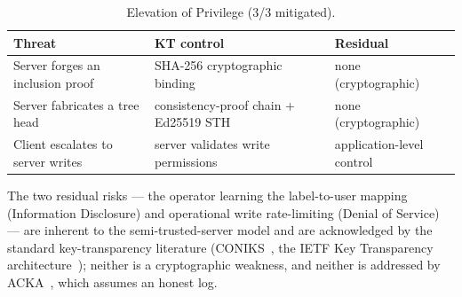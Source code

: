 \begin{table}[ht]
\centering
\caption{Elevation of Privilege (3/3 mitigated).}
\label{tab:stride-e}
\footnotesize
\begin{tabular}{@{}p{4.4cm}p{5.2cm}p{4.0cm}@{}}
\toprule
Threat & KT control & Residual \\
\midrule
Server forges an inclusion proof & SHA-256 cryptographic binding & none (cryptographic) \\
Server fabricates a tree head & consistency-proof chain + Ed25519 STH & none (cryptographic) \\
Client escalates to server writes & server validates write permissions & application-level control \\
\bottomrule
\end{tabular}
\end{table}

The two residual risks --- the operator learning the label-to-user mapping (Information Disclosure)
and operational write rate-limiting (Denial of Service) --- are inherent to the semi-trusted-server
model and are acknowledged by the standard key-transparency literature (CONIKS~\cite{melara2015coniks},
the IETF Key Transparency architecture~\cite{ietf-keytrans-protocol}); neither is a cryptographic
weakness, and neither is addressed by ACKA~\cite{dowling2023acka}, which assumes an honest log.
